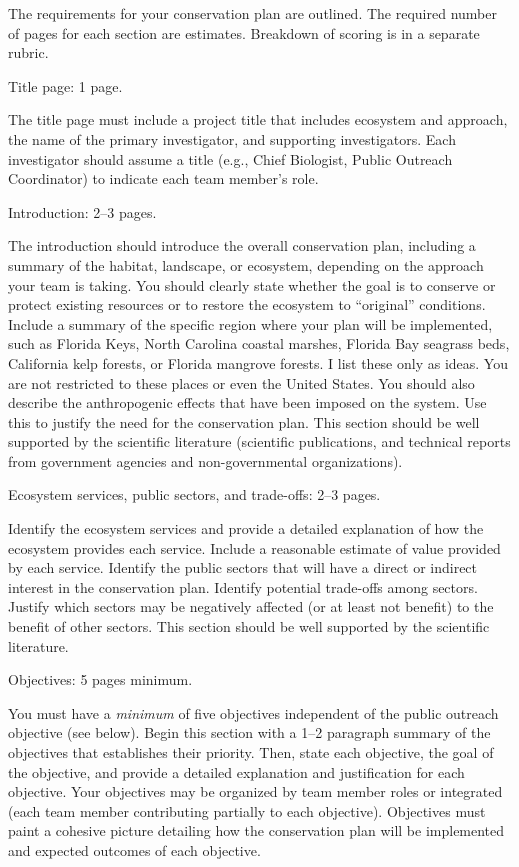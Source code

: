 \documentclass[12pt, hidelinks]{exam}
\begin{document}
The requirements for your conservation plan are outlined. The required number of pages for each section are estimates. Breakdown of scoring is in a separate rubric.

\begin{questions}
	
	\question[5]
	Title page: 1 page.
	
	The title page must include a project title that includes ecosystem and approach, the name of the primary investigator, and supporting investigators. Each investigator should assume a title (e.g., Chief Biologist, Public Outreach Coordinator) to indicate each team member's role. 
	
	\question[15]
	Introduction: 2--3 pages.
	
	The introduction should introduce the overall conservation plan, including a summary of the habitat, landscape,  or ecosystem, depending on the approach your team is taking.  You should clearly state whether the goal is to conserve or protect existing resources or to restore the ecosystem to ``original'' conditions. Include a summary of the specific region where your plan will be implemented, such as Florida Keys, North Carolina coastal marshes, Florida Bay seagrass beds, California kelp forests, or Florida mangrove forests. I list these only as ideas. You are not restricted to these places or even the United States. You should also describe the anthropogenic effects that have been imposed on the system. Use this to justify the need for the conservation plan. This section should be well supported by the scientific literature (scientific publications,  and technical reports from government agencies and non-governmental organizations). 
	
	
	\question[20]
	Ecosystem services, public sectors, and trade-offs: 2--3 pages.
	
	Identify the ecosystem services and provide a detailed explanation of how the ecosystem provides each service. Include a reasonable estimate of value provided by each service. Identify the public sectors that will have a direct or indirect interest in the conservation plan. Identify potential trade-offs among sectors. Justify which sectors may be negatively affected (or at least not benefit) to the benefit of other sectors. This section should be well supported by the scientific literature.
	
	\question[50]
	Objectives: 5 pages minimum.
	
	You must have a \emph{minimum} of five objectives independent of the public outreach objective (see below). Begin this section with a 1--2 paragraph summary of the objectives that establishes their priority. Then, state each objective, the  goal of the objective, and provide a detailed explanation and justification for each objective. Your objectives may be organized by team member roles or integrated (each team member contributing partially to each objective). Objectives must paint a cohesive picture detailing how the conservation plan will be implemented and expected outcomes of each objective.
	

\end{questions}
\end{document}
